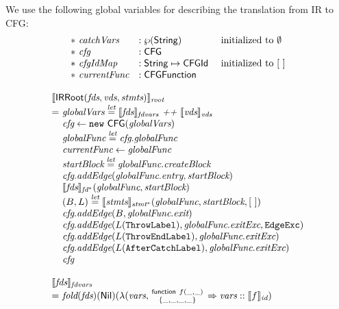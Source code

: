 We use the following global variables for describing the translation from IR to CFG:
\[
\begin{array}{lll}
*\ \emph{catchVars} &: \wp(\mbox{\textsf{String}}) & \text{ initialized to } \emptyset\\
*\ \emph{cfg} &: \mbox{\textsf{CFG}} &\\
*\ \emph{cfgIdMap} &: \mbox{\textsf{String}} \mapsto \mbox{\textsf{CFGId}} & \text{ initialized to } [\ ]\\
*\ \emph{currentFunc} &: \mbox{\textsf{CFGFunction}} & \\
\end{array}
\]

\[
\begin{array}{l@{}l@{~}l}
\lefteqn{\transfun{\IRRoot(\emph{fds}, \emph{vds}, \emph{stmts})}_{\emph{root}}}\\
& = & \emph{globalVars} \letval \transfun{\emph{fds}}_{\emph{fdvars}} ~\emph{++}~ \transfun{\emph{vds}}_{\emph{vds}} \\
& & \emph{cfg} \leftarrow \new\ \CFG(\emph{globalVars})\\
& & \emph{globalFunc} \letval \emph{cfg}.\emph{globalFunc}\\
& & \emph{currentFunc} \leftarrow \emph{globalFunc}\\
& & \emph{startBlock} \letval \emph{globalFunc}.\emph{createBlock}\\
& & \emph{cfg}.\emph{addEdge}(\emph{globalFunc}.\emph{entry}, \emph{startBlock})\\
& & \transfun{\emph{fds}}_{\emph{fd}^*}(\emph{globalFunc}, \emph{startBlock})\\
& & (B, L) \letval \transfun{\emph{stmts}}_{\emph{stmt}^{*}}(\emph{globalFunc}, \emph{startBlock}, [\ ])\\
& & \emph{cfg}.\emph{addEdge}(B, \emph{globalFunc}.\emph{exit})\\
& & \emph{cfg}.\emph{addEdge}(L(\TT{ThrowLabel}), \emph{globalFunc}.\emph{exitExc}, \EdgeExc)\\
& & \emph{cfg}.\emph{addEdge}(L(\TT{ThrowEndLabel}), \emph{globalFunc}.\emph{exitExc})\\
& & \emph{cfg}.\emph{addEdge}(L(\TT{AfterCatchLabel}), \emph{globalFunc}.\emph{exitExc})\\
& & \emph{cfg}\\
& & \\
\lefteqn{\transfun{\emph{fds}}_{\emph{fdvars}}}\\
 & = &
\fold(\emph{fds})(\Nil)(\lambda(\emph{vars}, \irfundeclsmall{f}{\_}{\_}{\_}{\_}{\_}{\_} \Rightarrow \emph{vars} :: \transfun{f}_{\emph{id}})\\
& & \\


\end{array}\]

